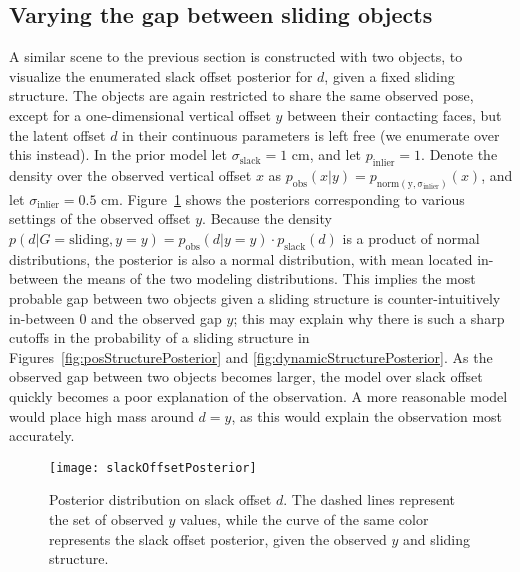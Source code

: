 \subsection{Varying the gap between sliding objects}
A similar scene to the previous section is constructed with two objects, to visualize the enumerated slack offset posterior for $d$, given a fixed sliding structure.
The objects are again restricted to share the same observed pose, except for a one-dimensional vertical offset $y$ between their contacting faces, but the latent offset $d$ in their continuous parameters is left free (we enumerate over this instead).
In the prior model let $\sigma_\mathrm{slack} = 1$ cm, and let $p_\mathrm{inlier} = 1$.
Denote the density over the observed vertical offset $x$ as $p_\mathrm{obs}(x | y) = p_\mathrm{norm(y,\sigma_\mathrm{inlier})}(x)$, and let $\sigma_\mathrm{inlier} = 0.5$ cm.
Figure~\ref{fig:slackOffsetPosterior} shows the posteriors corresponding to various settings of the observed offset $y$.
Because the density $p(d | G=\mathrm{sliding}, y=y) = p_\mathrm{obs}(d | y=y) \cdot p_\mathrm{slack}(d)$ is a product of normal distributions, the posterior is also a normal distribution, with mean located in-between the means of the two modeling distributions.
This implies the most probable gap between two objects given a sliding structure is counter-intuitively in-between 0 and the observed gap $y$; this may explain why there is such a sharp cutoffs in the probability of a sliding structure in Figures~\ref{fig:posStructurePosterior} and \ref{fig:dynamicStructurePosterior}.
As the observed gap between two objects becomes larger, the model over slack offset quickly becomes a poor explanation of the observation.
A more reasonable model would place high mass around $d = y$, as this would explain the observation most accurately.

\begin{figure}[H]
  \centering
  \texttt{[image: slackOffsetPosterior]}
  \caption{
    Posterior distribution on slack offset $d$.
    The dashed lines represent the set of observed $y$ values, while the curve of the same color represents the slack offset posterior, given the observed $y$ and sliding structure.
  }
  \label{fig:slackOffsetPosterior}
\end{figure}


